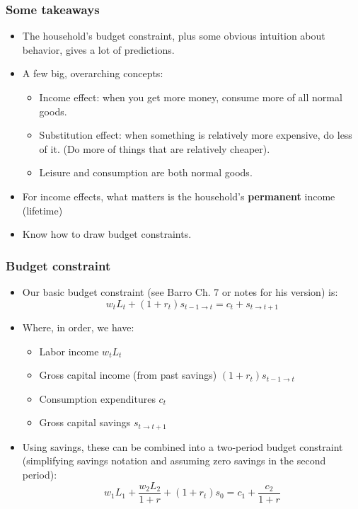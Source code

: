 \documentclass{beamer}
\author{Trevor Gallen}
\date{}
\begin{document}
\begin{frame}
\titlepage
\end{frame}

\begin{frame}
\frametitle{Some takeaways}
\begin{itemize}
\item The household's budget constraint, plus some obvious intuition about behavior, gives a lot of predictions.
\bigskip
\item A few big, overarching concepts:
\begin{itemize}
\item Income effect:  when you get more money, consume more of all normal goods.
\bigskip
\item Substitution effect:  when something is relatively more expensive, do less of it.  (Do more of things that are relatively cheaper).
\bigskip
\item Leisure and consumption are both normal goods.
\end{itemize}
\bigskip
\item For income effects, what matters is the household's \textbf{permanent} income (lifetime)
\bigskip
\item Know how to draw budget constraints.
\end{itemize}
\end{frame}

\begin{frame}
\frametitle{Budget constraint}
\begin{itemize}
\item Our basic budget constraint (see Barro Ch. 7 or notes for his version) is:
$$w_tL_t+(1+r_t)s_{t-1\rightarrow t}=c_t+s_{t\rightarrow t+1}$$
\item Where, in order, we have:
\begin{itemize} 
\item Labor income $w_tL_t$
\item  Gross capital income (from past savings) $(1+r_t)s_{t-1\rightarrow t}$
\item Consumption expenditures $c_t$
\item Gross capital savings $s_{t\rightarrow t+1}$
\end{itemize}
\item Using savings, these can be combined into a two-period budget constraint (simplifying savings notation and assuming zero savings in the second period):
$$w_1L_1+\frac{w_2L_2}{1+r}+(1+r_t)s_{0}=c_1+\frac{c_2}{1+r}$$
\end{itemize}
\end{frame}
\end{document}
